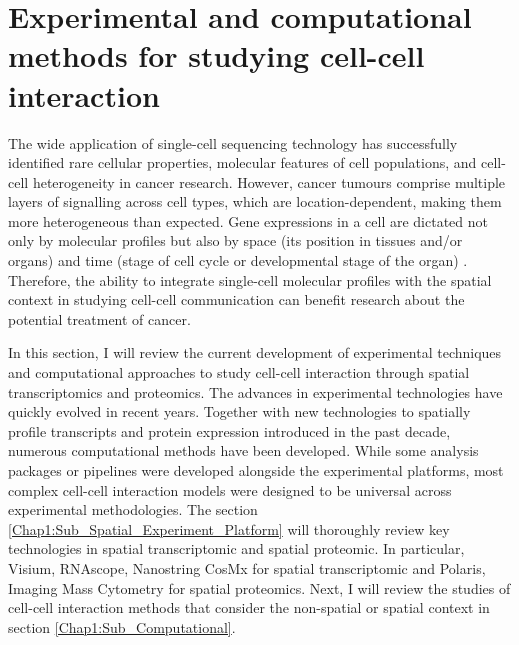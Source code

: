 \section{Experimental and computational methods for studying cell-cell interaction}
\label{section:lit_review}
The wide application of single-cell sequencing technology has successfully identified rare cellular properties, molecular features of cell populations, and cell-cell heterogeneity in cancer research. However, cancer tumours comprise multiple layers of signalling across cell types, which are location-dependent, making them more heterogeneous than expected. Gene expressions in a cell are dictated not only by molecular profiles but also by space (\ie its position in tissues and/or organs) and time (\ie stage of cell cycle or developmental stage of the organ) \cite{salomon2020genomic}. Therefore, the ability to integrate single-cell molecular profiles with the spatial context in studying cell-cell communication can benefit research about the potential treatment of cancer.

In this section, I will review the current development of experimental techniques and computational approaches to study cell-cell interaction through spatial transcriptomics and proteomics. The advances in experimental technologies have quickly evolved in recent years. Together with new technologies to spatially profile transcripts and protein expression introduced in the past decade, numerous computational methods have been developed. While some analysis packages or pipelines were developed alongside the experimental platforms, most complex cell-cell interaction models were designed to be universal across experimental methodologies. The section \ref{Chap1:Sub_Spatial_Experiment_Platform} will thoroughly review key technologies in spatial transcriptomic and spatial proteomic. In particular, Visium, RNAscope, Nanostring CosMx for spatial transcriptomic and Polaris, Imaging Mass Cytometry for spatial proteomics. Next, I will review the studies of cell-cell interaction methods that consider the non-spatial or spatial context in section \ref{Chap1:Sub_Computational}.          

